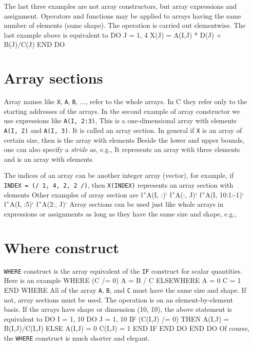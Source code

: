 {The last three examples are not array constructors, but array
expressions and assignment. Operators and functions may be applied to
arrays having the same number of elements (same shape).  The operation is 
carried out elementwise.  The last example above is equivalent to
\ttbg
DO J = 1, 4
   X(J) = A(I,J) * D(J) + B(J)/C(J)
END DO
\tted
\sms
\section{Array sections}
Array names like {\tt X}, {\tt A}, {\tt B}, $\ldots$, refer to the
whole arrays.  In C they refer only to the starting addresses of the
arrays. In the second example of array constructor we use expressions like
{\tt A(I, 2:3)},  This is a one-dimensional array with elements
{\tt A(I, 2)} and {\tt A(I, 3)}.  It is called an array section. 
In general if {\tt X} is an array of certain size, then 
\sms
{}
\sms
is the array with elements 
\sms
{}
\sms
Beside the lower and upper bounds, one can also specify a {\sl
stride} as, e.g.,  
\sms
{}
\sms
It represents an array with three elements
\sms
{}
and 
\sms
is an array with elements
\sms
{}
\sms


The indices of an array can be another integer array (vector), for
example,  if {\tt INDEX = (/ 1, 4, 2, 2 /)}, then {\tt X(INDEX)} 
represents an array section with elements
\sms
{}
\sms
Other examples of array section are 
\sms
\l{\v`A(I, :)`}
\l{\v`A(:, J)`}
\l{\v`A(I, 10:1:-1)`}
\l{\v`A(I, :5)`}
\l{\v`A(2:, J)`}
\sms
Array sections can be used just like whole arrays in expressions or 
assignments as long as they have the same size and shape, e.g.,
\sms
{}
\sms

\section{Where construct}
{\tt WHERE} construct is the array equivalent of the {\tt IF}
construct for scalar quantities.  Here is an example
\ttbg
WHERE (C /= 0)
   A = B / C
ELSEWHERE
   A = 0
   C = 1
END WHERE
\tted
All of the array {\tt A}, {\tt B}, and {\tt C} must have the same
size and shape.  If not, array sections must be used.
The operation is on an element-\-by-\-element basis.
If the arrays have shape or dimension (10, 10), 
the above statement is equivalent to 
\ttbg
DO I = 1, 10
   DO J = 1, 10
      IF (C(I,J) /= 0) THEN
         A(I,J) = B(I,J)/C(I,J)
      ELSE
         A(I,J) = 0
         C(I,J) = 1
      END IF
   END DO
END DO
\tted
Of course, the {\tt WHERE} construct is much shorter and elegant.

}
